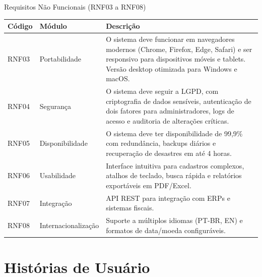 \documentclass[
	12pt,				%
	openany,			%
	twoside,			%
	a4paper,			%
	english,			%
	brazil				%
	]{abntex2}
\begin{document}
\begin{quadro}[htb]
\caption{\label{quadro_rnf2}Requisitos Não Funcionais (RNF03 a RNF08)}
\begin{tabular}{|p{1.2cm}|p{3.5cm}|p{11.0cm}|}
    \hline
    \textbf{Código} & \textbf{Módulo} & \textbf{Descrição} \\ \hline


    RNF03 & Portabilidade & O sistema deve funcionar em navegadores modernos (Chrome, Firefox, Edge, Safari) e ser responsivo para dispositivos móveis e tablets. Versão desktop otimizada para Windows e macOS. \\ \hline


    RNF04 & Segurança & O sistema deve seguir a LGPD, com criptografia de dados sensíveis, autenticação de dois fatores para administradores, logs de acesso e auditoria de alterações críticas. \\ \hline

    RNF05 & Disponibilidade & O sistema deve ter disponibilidade de 99,9\% com redundância, backups diários e recuperação de desastres em até 4 horas. \\ \hline

    RNF06 & Usabilidade & Interface intuitiva para cadastros complexos, atalhos de teclado, busca rápida e relatórios exportáveis em PDF/Excel. \\ \hline

    RNF07 & Integração & API REST para integração com ERPs e sistemas fiscais. \\ \hline

    RNF08 & Internacionalização & Suporte a múltiplos idiomas (PT-BR, EN) e formatos de data/moeda configuráveis. \\ \hline

\end{tabular}
\end{quadro}

\FloatBarrier




\section{Histórias de Usuário}
\end{document}
